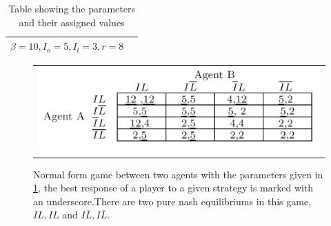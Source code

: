 \begin{table}[h]
\centering
\begin{tabular}{lc}
 \hline
  $\beta=10,
  I_{o}=5,
  I_{l}=3,
  r=8$\\
  \hline
\end{tabular}
\caption{Table showing the parameters and their assigned values \label{tbl:simplegamevalue}}
\end{table}

\begin{figure}[h]
\centering
\begin{tabular}{@{}c@{}}
\includegraphics[width=1.0\textwidth]{../Figures/gameTheoryModel1WithNumbers.png}
\end{tabular}
\caption[Caption for LOF]{Normal form game between two agents with the parameters given in \ref{tbl:simplegamevalue}, the best response of a player to a given strategy is marked with an underscore.There are two pure nash equilibriums in this game,$IL,IL$ and $I\overline{L},I\overline{L}$. \label{fig:NFnumbers}}
\end{figure}

